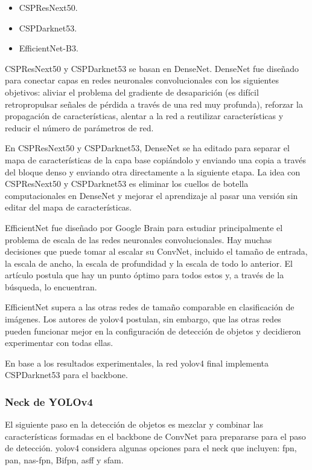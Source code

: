 \begin{itemize}
    \item CSPResNext50.
    \item CSPDarknet53.
    \item EfficientNet-B3.
\end{itemize}

CSPResNext50 y CSPDarknet53 se basan en DenseNet. DenseNet fue diseñado para conectar capas en redes neuronales convolucionales con los siguientes objetivos: aliviar el problema del gradiente de desaparición (es difícil retropropulsar señales de pérdida a través de una red muy profunda), reforzar la propagación de características, alentar a la red a reutilizar características y reducir el número de parámetros de red.

En CSPResNext50 y CSPDarknet53, DenseNet se ha editado para separar el mapa de características de la capa base copiándolo y enviando una copia a través del bloque denso y enviando otra directamente a la siguiente etapa. La idea con CSPResNext50 y CSPDarknet53 es eliminar los cuellos de botella computacionales en DenseNet y mejorar el aprendizaje al pasar una versión sin editar del mapa de características.

EfficientNet fue diseñado por Google Brain para estudiar principalmente el problema de escala de las redes neuronales convolucionales. Hay muchas decisiones que puede tomar al escalar su ConvNet, incluido el tamaño de entrada, la escala de ancho, la escala de profundidad y la escala de todo lo anterior. El artículo \cite{tan2020efficientdet} postula que hay un punto óptimo para todos estos y, a través de la búsqueda, lo encuentran.

EfficientNet supera a las otras redes de tamaño comparable en clasificación de imágenes. Los autores de \gls{yolov4} postulan, sin embargo, que las otras redes pueden funcionar mejor en la configuración de detección de objetos y decidieron experimentar con todas ellas.

En base a los resultados experimentales, la red \gls{yolov4} final implementa CSPDarknet53 para el backbone.

\subsubsection*{Neck de YOLOv4}
\label{subsubsec:yolov4-neck}

El siguiente paso en la detección de objetos es mezclar y combinar las características formadas en el backbone de ConvNet para prepararse para el paso de detección. \gls{yolov4} considera algunas opciones para el neck que incluyen: \gls{fpn}, \gls{pan}, \gls{nas}-\gls{fpn}, Bi\gls{fpn}, \gls{asff} y \gls{sfam}.


